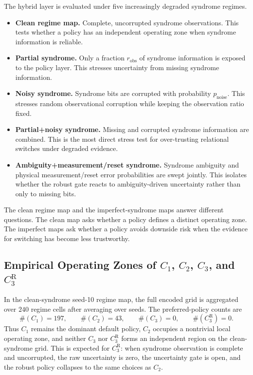 \documentclass[11pt,a4paper]{article}
\theoremstyle{definition}
\theoremstyle{remark}
\begin{document}
The hybrid layer is evaluated under five increasingly degraded syndrome regimes.
\begin{itemize}
\item \textbf{Clean regime map.}  Complete, uncorrupted syndrome observations.  This
tests whether a policy has an independent operating zone when syndrome information is
reliable.
\item \textbf{Partial syndrome.}  Only a fraction $r_{\mathrm{obs}}$ of syndrome
information is exposed to the policy layer.  This stresses uncertainty from missing
syndrome information.
\item \textbf{Noisy syndrome.}  Syndrome bits are corrupted with probability
$p_{\mathrm{noise}}$.  This stresses random observational corruption while keeping
the observation ratio fixed.
\item \textbf{Partial+noisy syndrome.}  Missing and corrupted syndrome information
are combined.  This is the most direct stress test for over-trusting relational
switches under degraded evidence.
\item \textbf{Ambiguity+measurement/reset syndrome.}  Syndrome ambiguity and physical
measurement/reset error probabilities are swept jointly.  This isolates whether the
robust gate reacts to ambiguity-driven uncertainty rather than only to missing bits.
\end{itemize}

The clean regime map and the imperfect-syndrome maps answer different questions.
The clean map asks whether a policy defines a distinct operating zone.  The imperfect
maps ask whether a policy avoids downside risk when the evidence for switching has
become less trustworthy.

\subsection{Empirical Operating Zones of $C_1$, $C_2$, $C_3$, and $C_3^{\mathrm{R}}$}

In the clean-syndrome seed-10 regime map, the full encoded grid is aggregated over
$240$ regime cells after averaging over seeds.  The preferred-policy counts are
\[
\#(C_1)=197,
\qquad
\#(C_2)=43,
\qquad
\#(C_3)=0,
\qquad
\#(C_3^{\mathrm{R}})=0.
\]
Thus $C_1$ remains the dominant default policy, $C_2$ occupies a nontrivial local
operating zone, and neither $C_3$ nor $C_3^{\mathrm{R}}$ forms an independent region
on the clean-syndrome grid.  This is expected for $C_3^{\mathrm{R}}$: when syndrome
observation is complete and uncorrupted, the raw uncertainty is zero, the uncertainty
gate is open, and the robust policy collapses to the same choices as $C_2$.
\end{document}

